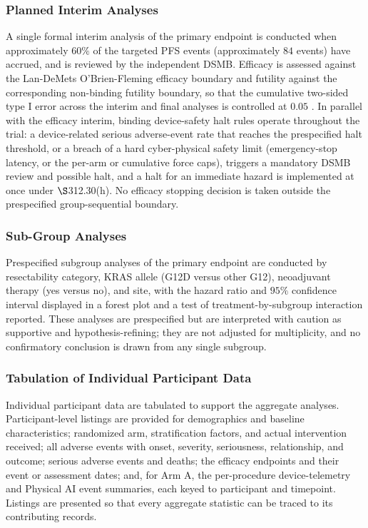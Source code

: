 \subsubsection{Planned Interim Analyses}

A single formal interim analysis of the primary endpoint is conducted when
approximately $60\%$ of the targeted PFS events (approximately $84$ events) have
accrued, and is reviewed by the independent DSMB. Efficacy is assessed against the
Lan-DeMets O'Brien-Fleming efficacy boundary and futility against the corresponding
non-binding futility boundary, so that the cumulative two-sided type I error across
the interim and final analyses is controlled at $0.05$
\cite{DeMets1994lan,Jennison2000group}. In parallel with the efficacy interim, binding
device-safety halt rules operate throughout the trial: a device-related serious
adverse-event rate that reaches the prespecified halt threshold, or a breach of a hard
cyber-physical safety limit (emergency-stop latency, or the per-arm or cumulative
force caps), triggers a mandatory DSMB review and possible halt, and a halt for an
immediate hazard is implemented at once under $\S$312.30(h). No efficacy stopping
decision is taken outside the prespecified group-sequential boundary.


\clearpage

\subsubsection{Sub-Group Analyses}

Prespecified subgroup analyses of the primary endpoint are conducted by resectability
category, KRAS allele (G12D versus other G12), neoadjuvant therapy (yes versus no),
and site, with the hazard ratio and $95\%$ confidence interval displayed in a forest
plot and a test of treatment-by-subgroup interaction reported. These analyses are
prespecified but are interpreted with caution as supportive and hypothesis-refining;
they are not adjusted for multiplicity, and no confirmatory conclusion is drawn from
any single subgroup.

\subsubsection{Tabulation of Individual Participant Data}

Individual participant data are tabulated to support the aggregate analyses.
Participant-level listings are provided for demographics and baseline characteristics;
randomized arm, stratification factors, and actual intervention received; all adverse
events with onset, severity, seriousness, relationship, and outcome; serious adverse
events and deaths; the efficacy endpoints and their event or assessment dates; and,
for Arm A, the per-procedure device-telemetry and Physical AI event summaries, each
keyed to participant and timepoint. Listings are presented so that every aggregate
statistic can be traced to its contributing records.

